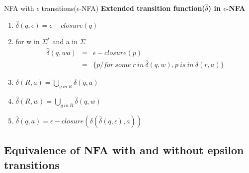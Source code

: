 \documentclass{beamer}
\begin{document}
\begin{frame}{NFA with $\epsilon$ transitions($\epsilon$-NFA)}
	\textbf{Extended transition function($\hat{\delta}$) in $\epsilon$-NFA}
	\begin{enumerate}
		\item $\hat{\delta}(q,\epsilon)=\epsilon-closure(q)$
		\item for w in $\Sigma^*$ and a in $\Sigma$
		\begin{eqnarray*}
			\hat{\delta}(q,wa)&=&\epsilon-closure(p)\\
			&=&\{p/for\ some\ r\ in\ \hat{\delta}(q,w),p\ is\ in \ \delta(r,a)\}
		\end{eqnarray*}
	\item $\delta(R,a)=\bigcup\limits_{q\ in \ R}\delta(q,a)$
	\item $\hat{\delta}(R,w)=\bigcup\limits_{q\ in \ R}\hat{\delta}(q,w)$	
	\item $\hat{\delta}(q,a)=\epsilon-closure(\delta(\hat{\delta}(q,\epsilon),a))$
	\end{enumerate}
\end{frame}
\subsection{Equivalence of NFA with and without epsilon transitions}
\end{document}
